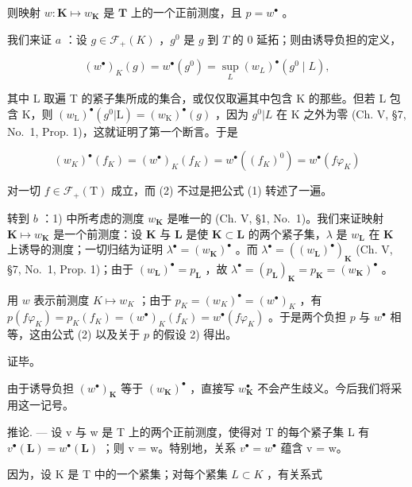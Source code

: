 则映射 \(w: \mathbf{K} \mapsto w_{\mathbf{K}}\) 是 \(\mathbf{T}\) 上的一个正前测度，且 \(p = w^{\bullet}\) 。

我们来证 \(a\) ：设 \(g \in \mathcal{F}_{+}(K)\) ，\(g^{0}\) 是 \(g\) 到 \(T\) 的 0 延拓；则由诱导负担的定义，

\[
(w ^ {\bullet}) _ {K} (g) = w ^ {\bullet} \left(g ^ {0}\right) = \sup _ {L} \left(w _ {L}\right) ^ {\bullet} \left(g ^ {0} \mid L\right),
\]

其中 L 取遍 T 的紧子集所成的集合，或仅仅取遍其中包含 K 的那些。但若 L 包含 K，则 \((w_{\mathrm{L}})^{\bullet}(g^{0}|\mathrm{L})=(w_{\mathrm{K}})^{\bullet}(g)\) ，因为 \(g^{0}|L\) 在 K 之外为零 (Ch. V, §7, No.~1, Prop. 1)，这就证明了第一个断言。于是

\[
(w _ {K}) ^ {\bullet} (f _ {K}) = (w ^ {\bullet}) _ {K} (f _ {K}) = w ^ {\bullet} \left((f _ {K}) ^ {0}\right) = w ^ {\bullet} (f \varphi_ {K})
\]

对一切 \(f \in \mathcal{F}_{+}(\mathrm{T})\) 成立，而 (2) 不过是把公式 (1) 转述了一遍。

转到 \(b\) ：1) 中所考虑的测度 \(w_{\mathbf{K}}\) 是唯一的 (Ch. V, §1, No.~1)。我们来证映射 \(\mathbf{K} \mapsto w_{\mathbf{K}}\) 是一个前测度：设 \(\mathbf{K}\) 与 \(\mathbf{L}\) 是使 \(\mathbf{K} \subset \mathbf{L}\) 的两个紧子集，\(\lambda\) 是 \(w_{\mathbf{L}}\) 在 \(\mathbf{K}\) 上诱导的测度；一切归结为证明 \(\lambda^{\bullet} = (w_{\mathbf{K}})^{\bullet}\) 。而 \(\lambda^{\bullet} = ((w_{\mathbf{L}})^{\bullet})_{\mathbf{K}}\) (Ch. V, §7, No.~1, Prop. 1)；由于 \((w_{\mathbf{L}})^{\bullet} = p_{\mathbf{L}}\) ，故 \(\lambda^{\bullet} = (p_{\mathbf{L}})_{\mathbf{K}} = p_{\mathbf{K}} = (w_{\mathbf{K}})^{\bullet}\) 。

用 \(w\) 表示前测度 \(K \mapsto w_K\) ；由于 \(p_K = (w_K)^{\bullet} = (w^{\bullet})_K\) ，有 \(p(f\varphi_K) = p_K(f_K) = (w^{\bullet})_K(f_K) = w^{\bullet}(f\varphi_K)\) 。于是两个负担 \(p\) 与 \(w^{\bullet}\) 相等，这由公式 (2) 以及关于 \(p\) 的假设 2) 得出。

证毕。

由于诱导负担 \((w^{\bullet})_{\mathbf{K}}\) 等于 \((w_{\mathbf{K}})^{\bullet}\) ，直接写 \(w_{\mathbf{K}}^{\bullet}\) 不会产生歧义。今后我们将采用这一记号。

推论. --- 设 v 与 w 是 T 上的两个正前测度，使得对 T 的每个紧子集 L 有 \(v^{\bullet}(\mathbf{L}) = w^{\bullet}(\mathbf{L})\) ；则 v = w。特别地，关系 \(v^{\bullet} = w^{\bullet}\) 蕴含 v = w。

因为，设 K 是 T 中的一个紧集；对每个紧集 \(L \subset K\) ，有关系式

